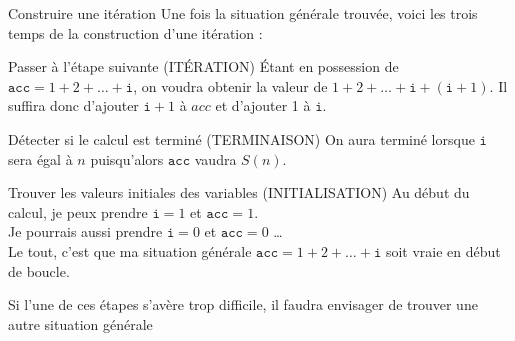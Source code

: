 \documentclass[10pt]{beamer}
\begin{document}

\begin{frame}{Construire une itération}
  Une fois la situation générale trouvée, voici les trois temps de la construction d'une itération :
  \begin{block}{Passer à l'étape suivante (\alert{ITÉRATION})}
    Étant en possession de $\mathtt{acc} = 1 + 2 + \dots + \mathtt{i}$, on voudra obtenir la valeur de $1 + 2 + \ldots + \mathtt{i} + (\mathtt{i}+1)$. Il suffira donc d'ajouter $\mathtt{i}+1$ à $acc$ et d'ajouter 1 à $\mathtt{i}$.
  \end{block}
  \begin{block}{Détecter si le calcul est terminé (\alert{TERMINAISON})}
    On aura terminé lorsque $\mathtt{i}$ sera égal à $n$ puisqu'alors $\mathtt{acc}$ vaudra $S(n)$.
  \end{block}

  \begin{block}{Trouver les valeurs initiales des variables (\alert{INITIALISATION})}
    Au début du calcul, je peux prendre $\mathtt{i} = 1$ et $\mathtt{acc} =1$. \\
    Je pourrais aussi prendre $\mathtt{i} = 0$ et $\mathtt{acc} = 0$ \dots \\
    Le tout, c'est que ma situation générale $\mathtt{acc} = 1 + 2 + \ldots + \mathtt{i}$ soit vraie en début de boucle.
  \end{block}
  Si l'une de ces étapes s'avère trop difficile, il faudra envisager de trouver une autre situation générale
\end{frame}
\def\circledarrow#1#2#3{ %
\draw[#1,->] (#2) +(80:#3) arc(80:-260:#3);
}
\end{document}
